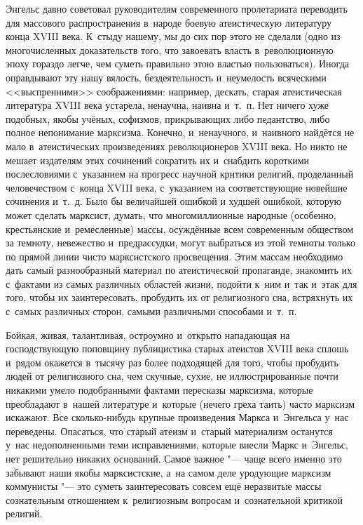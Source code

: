 Энгельс давно советовал руководителям современного пролетариата переводить
для массового распространения в~народе боевую атеистическую литературу
конца XVIII века. К~стыду
нашему, мы до сих пор этого не сделали (одно из многочисленных
доказательств того, что завоевать власть в~революционную эпоху гораздо
легче, чем суметь правильно этою властью пользоваться). Иногда
оправдывают эту нашу вялость, бездеятельность и~неумелость всяческими
<<выспренними>> соображениями: например, дескать, старая атеистическая
литература XVIII века устарела, ненаучна, наивна и~т.~п. Нет ничего хуже
подобных, якобы учёных, софизмов, прикрывающих либо педантство, либо
полное непонимание марксизма. Конечно, и~ненаучного, и~наивного найдётся
не мало в~атеистических произведениях революционеров XVIII века. Но
никто не мешает издателям этих сочинений сократить их и~снабдить
короткими послесловиями с~указанием на прогресс научной критики религий,
проделанный человечеством с~конца XVIII века, с~указанием на
соответствующие новейшие сочинения и~т.~д. Было бы величайшей ошибкой и
худшей ошибкой, которую может сделать марксист, думать, что многомиллионные
народные (особенно, крестьянские и~ремесленные) массы, осуждённые всем
современным обществом за темноту, невежество и~предрассудки, могут
выбраться из этой темноты только по прямой линии чисто марксистского
просвещения. Этим массам необходимо дать самый разнообразный материал по
атеистической пропаганде, знакомить их с~фактами из самых различных
областей жизни, подойти к~ним и~так и~этак для того, чтобы их
заинтересовать, пробудить их от религиозного сна, встряхнуть их с~самых
различных сторон, самыми различными способами и~т.~п.

Бойкая, живая, талантливая, остроумно и~открыто нападающая на господствующую
поповщину публицистика старых атеистов XVIII века сплошь и~рядом окажется
в~тысячу раз более подходящей для того, чтобы пробудить людей от религиозного
сна, чем скучные, сухие, не иллюстрированные почти никакими умело
подобранными фактами пересказы марксизма, которые преобладают в~нашей
литературе и~которые (нечего греха таить) часто марксизм искажают. Все
сколько-нибудь крупные произведения Маркса и~Энгельса у~нас
переведены. Опасаться, что старый атеизм и~старый материализм останутся
у~нас недополненными теми исправлениями, которые внесли Маркс и~Энгельс,
нет решительно никаких оснований. Самое важное "--- чаще всего именно это
забывают наши якобы марксистские, а~на самом деле уродующие марксизм
коммунисты "--- это суметь заинтересовать совсем ещё неразвитые массы
сознательным отношением к~религиозным вопросам и~сознательной
критикой религий.

